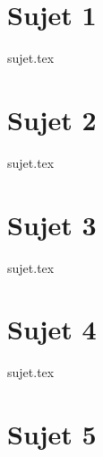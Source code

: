 \documentclass[a4paper, 11pt]{book}
\begin{document}
\resetQ
\newpage

\chapter{Sujet 1}

{sujet.tex}

\resetQ
\newpage

\chapter{Sujet 2}

{sujet.tex}

\resetQ
\newpage

\chapter{Sujet 3}

{sujet.tex}

\resetQ
\newpage

\chapter{Sujet 4}
\resetQ
{sujet.tex}

\chapter{Sujet 5}
\end{document}
